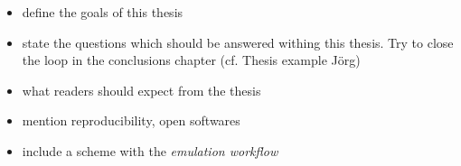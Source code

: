 \begin{itemize}
\itemsep0em
  \item define the goals of this thesis
  \item state the questions which should be answered withing this thesis. Try to close the loop in the conclusions chapter (cf. Thesis example Jörg)
  \item what readers should expect from the thesis
  \item mention reproducibility, open softwares
  \item include a scheme with the \emph{emulation workflow}
\end{itemize}








